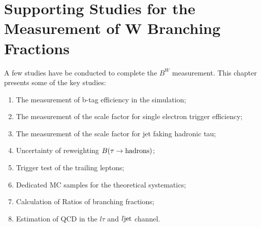 \chapter{Supporting Studies for the Measurement of W Branching Fractions}
\label{sec:app}

A few studies have be conducted to complete the $B^W$ measurement. This chapter presents some of the key studies:
\begin{enumerate}
    \item The measurement of b-tag efficiency in the simulation;
    \item The measurement of the scale factor for single electron trigger efficiency;
    \item The measurement of the scale factor for jet faking hadronic tau;
    \item Uncertainty of reweighting $B(\tau \to  \rm{hadrons})$;
    \item Trigger test of the trailing leptons;
    \item Dedicated MC samples for the \ttbar theoretical systematics;
    \item Calculation of Ratios of branching fractions;
    \item Estimation of QCD in the $l\tau$ and $l\rm{jet}$ channel.
\end{enumerate}





% 
% 
% 
% 
% 
% 
% 
% 
